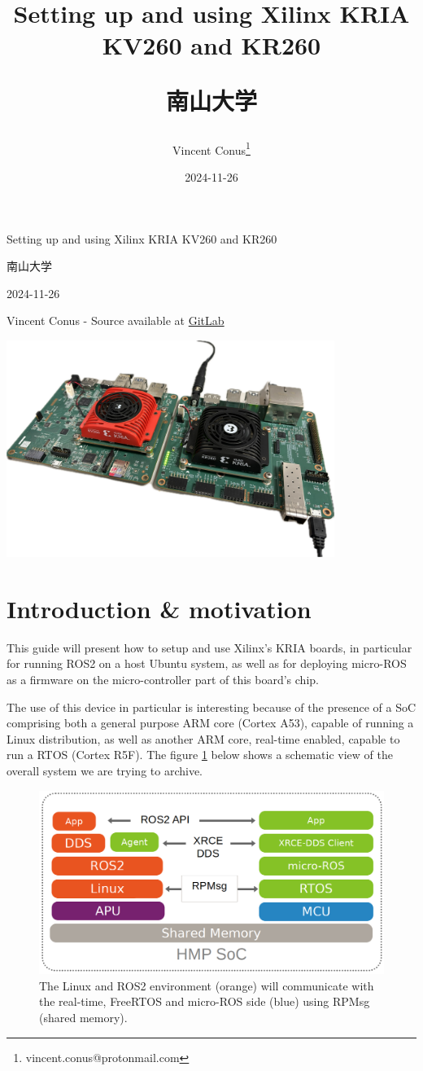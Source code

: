 \documentclass[10pt]{article}
\author{Vincent Conus\thanks{vincent.conus@protonmail.com}}
\date{2024-11-26}
\title{Setting up and using Xilinx KRIA KV260 and KR260\\\medskip
\large \begin{CJK}{UTF8}{min}南山大学\end{CJK}}
\newcommand{\gitlab}[1]{%
\href{#1}{GitLab \faGitlab}}
\begin{document}
\begin{titlepage}
\centering
{\LARGE Setting up and using Xilinx KRIA KV260 and KR260 \par }
\vspace{5mm}
{\large \begin{CJK}{UTF8}{min}南山大学\end{CJK} \par}
\vspace{1cm}
{\large 2024-11-26 \par}
\vspace{2cm}
{\large Vincent Conus -  Source available at \gitlab{https://gitlab.com/sunoc/xilinx-kria-kv260-documentation} \par}
\vspace{3cm}
\includegraphics[width=0.8\textwidth]{./img/boards}\end{titlepage}
\tableofcontents
\pagebreak
\section{Introduction \& motivation}
\label{sec:orga8b2d05}
This guide will present how to setup and use Xilinx's KRIA boards, in particular
for running ROS2 on a host Ubuntu system, as well as for deploying
micro-ROS\cite{Belsare2023} as a firmware on the micro-controller part of this board's chip.

The use of this device in particular is interesting because of the presence of a
SoC comprising both a general purpose ARM core (Cortex A53), capable of running
a Linux distribution, as well as another ARM core, real-time enabled, capable to
run a RTOS (Cortex R5F). The figure \ref{fig:org638e273} below shows a schematic view of the
overall system we are trying to archive.

\begin{figure}[htbp]
\centering
\includegraphics[width=.6\textwidth]{img/map.png}
\caption{\label{fig:org638e273}The Linux and ROS2 environment (orange) will communicate with the real-time, FreeRTOS and micro-ROS side (blue) using RPMsg (shared memory).}
\end{figure}
\end{document}
